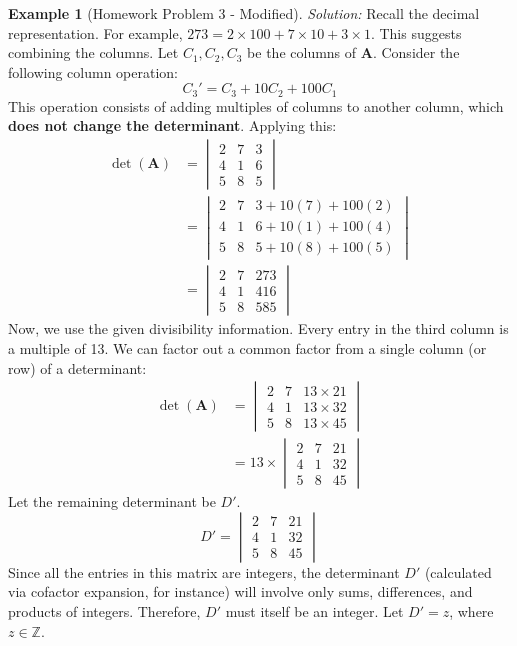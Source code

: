 \documentclass[11pt]{article}
\theoremstyle{definition}
\newtheorem{example}[theorem]{Example}
\theoremstyle{remark}
\newcommand{\field}[1]{\mathbb{#1}} %
\newcommand{\Z}{\field{Z}} %
\DeclareMathOperator{\det}{det}
\newcommand{\mat}[1]{\mathbf{#1}} %
\begin{document}
\begin{example}[Homework Problem 3 - Modified]
\textit{Solution:}
Recall the decimal representation. For example, $273 = 2 \times 100 + 7 \times 10 + 3 \times 1$. This suggests combining the columns. Let $C_1, C_2, C_3$ be the columns of $\mat{A}$. Consider the following column operation:
\[ C_3' = C_3 + 10 C_2 + 100 C_1 \]
This operation consists of adding multiples of columns to another column, which \textbf{does not change the determinant}. Applying this:
\begin{align*} \det(\mat{A}) &= \begin{vmatrix} 2 & 7 & 3 \\ 4 & 1 & 6 \\ 5 & 8 & 5 \end{vmatrix} \\ &= \begin{vmatrix} 2 & 7 & 3 + 10(7) + 100(2) \\ 4 & 1 & 6 + 10(1) + 100(4) \\ 5 & 8 & 5 + 10(8) + 100(5) \end{vmatrix} \\ &= \begin{vmatrix} 2 & 7 & 273 \\ 4 & 1 & 416 \\ 5 & 8 & 585 \end{vmatrix} \end{align*}
Now, we use the given divisibility information. Every entry in the third column is a multiple of 13. We can factor out a common factor from a single column (or row) of a determinant:
\begin{align*} \det(\mat{A}) &= \begin{vmatrix} 2 & 7 & 13 \times 21 \\ 4 & 1 & 13 \times 32 \\ 5 & 8 & 13 \times 45 \end{vmatrix} \\ &= 13 \times \begin{vmatrix} 2 & 7 & 21 \\ 4 & 1 & 32 \\ 5 & 8 & 45 \end{vmatrix} \end{align*}
Let the remaining determinant be $D'$.
\[ D' = \begin{vmatrix} 2 & 7 & 21 \\ 4 & 1 & 32 \\ 5 & 8 & 45 \end{vmatrix} \]
Since all the entries in this matrix are integers, the determinant $D'$ (calculated via cofactor expansion, for instance) will involve only sums, differences, and products of integers. Therefore, $D'$ must itself be an integer. Let $D' = z$, where $z \in \Z$.


\end{example}
\end{document}
